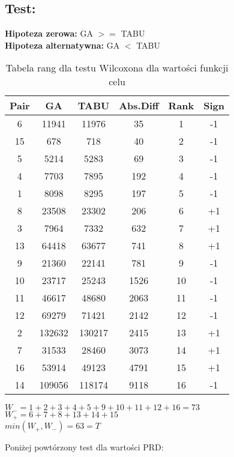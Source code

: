   \subsection{Test: }
    \textbf{Hipoteza zerowa: } GA $>=$ TABU \\
    \textbf{Hipoteza alternatywna: } GA $<$ TABU \\
    \begin{table}[H]
      \centering
      \begin{tabular}{| c | c | c | c | c | c |}
        \hline
        Pair & GA & TABU & Abs.Diff & Rank & Sign \\
        \hline
        6 & 11941 & 11976 & 35 & 1 & -1 \\
        15 & 678 & 718 & 40 & 2 & -1 \\
        5 & 5214 & 5283 & 69 & 3 & -1 \\
        4 & 7703 & 7895 & 192 & 4 & -1 \\
        1 & 8098 & 8295 & 197 & 5 & -1 \\
        8 & 23508 & 23302 & 206 & 6 & +1 \\
        3 & 7964 & 7332 & 632 & 7 & +1 \\
        13 & 64418 & 63677 & 741 & 8 & +1 \\
        9 & 21360 & 22141 & 781 & 9 & -1 \\
        10 & 23717 & 25243 & 1526 & 10 & -1 \\
        11 & 46617 & 48680 & 2063 & 11 & -1 \\
        12 & 69279 & 71421 & 2142 & 12 & -1 \\
        2 & 132632 & 130217 & 2415 & 13 & +1 \\
        7 & 31533 & 28460 & 3073 & 14 & +1 \\
        16 & 53914 & 49123 & 4791 & 15 & +1 \\
        14 & 109056 & 118174 & 9118 & 16 & -1 \\
        \hline
          
      \end{tabular}
      \caption{Tabela rang dla testu Wilcoxona dla wartości funkcji celu}
      $W_{-} = 1+2+3+4+5+9+10+11+12+16=73$ \\
      $W_{+} = 6+7+8+13+14+15 $ \\
      $min(W_{+},W_{-}) = 63 = T$ \\
  
    \end{table}
    Poniżej powtórzony test dla wartości PRD: \\
